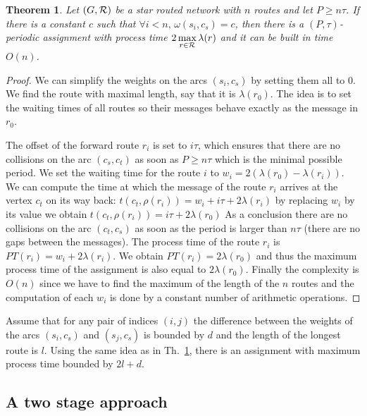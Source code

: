 \documentclass[10pt, conference, letterpaper]{IEEEtran}
\newtheorem{theorem}{Theorem}
\begin{document}
	 \begin{theorem}\label{th:asym}
	 Let $(G,{\cal R})$ be a star routed network with $n$ routes and let $P \geq n\tau$. If there is a constant $c$ such that $\forall i < n, \,\omega(s_i,c_s) = c$, then there is a $(P,\tau)$-periodic assignment with process time $2\, \displaystyle{\max_{r\in {\cal R}} \lambda(r)}$ and it can be built in time $O(n)$.
	 \end{theorem}
      \begin{proof}
      
        We can simplify the weights on the arcs $(s_i,c_s)$ by setting them all to $0$.
        We find the route with maximal length, say that it is $\lambda(r_0)$. The idea is to 
        set the waiting times of all routes so their messages behave exactly as the message in $r_0$.
        
        The offset of the forward route $r_i$ is set to $i\tau$, which ensures that there are no collisions on the arc $(c_s,c_t)$ as soon as $P \geq n\tau$ which is the minimal possible period. We set the waiting time for the route $i$ to $w_i = 2(\lambda(r_{0}) - \lambda(r_{i}))$. We can compute the time at which the message of the route $r_i$ arrives at the vertex $c_t$ on its way back: $t(c_t,\rho(r_i)) = w_i + i\tau + 2\lambda(r_{i})$
        by replacing $w_i$ by its value we obtain $t(c_t,\rho(r_i)) =  i\tau + 2\lambda(r_{0})$
        As a conclusion there are no collisions on the arc $(c_t,c_s)$ as soon as the 
        period is larger than $n\tau$ (there are no gaps between the messages).
        The process time of the route $r_i$ is $PT(r_i) = w_i + 2\lambda(r_{i}) $. We obtain $PT(r_i) = 2\lambda(r_{0})$ and thus the maximum process time of the assignment is also equal to $2\lambda(r_0)$.
	Finally the complexity is $O(n)$ since we have to find the maximum of the length of the $n$ routes and the computation of each $w_i$ is done by a constant number of arithmetic operations.
     \end{proof}
     
     Assume that for any pair of indices $(i,j)$ the difference between the weights of the arcs $(s_i,c_s)$ and $(s_j,c_s)$ is bounded by $d$ and the length of the longest route is $l$. Using the same idea as in Th.~\ref{th:asym}, there is an assignment with maximum process time bounded by  $2l + d$.
     
    
     \subsection{A two stage approach}
     
\end{document}
